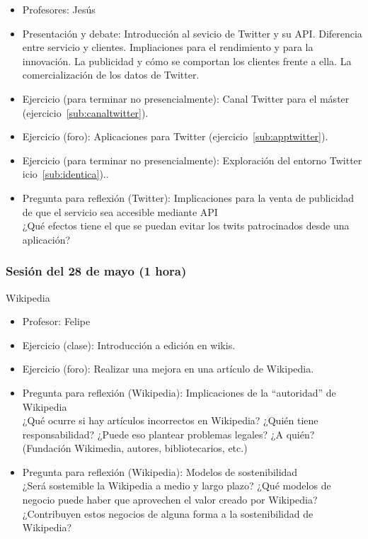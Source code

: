\documentclass[a4paper,12pt]{article}
\begin{document}
\begin{itemize}
\item Profesores: Jesús
\item Presentación y debate: Introducción al sevicio de Twitter y su API. Diferencia entre servicio y clientes. Impliaciones para el rendimiento y para la innovación. La publicidad y cómo se comportan los clientes frente a ella. La comercialización de los datos de Twitter.
\item Ejercicio (para terminar no presencialmente): Canal Twitter para el máster (ejercicio~\ref{sub:canaltwitter}).
\item Ejercicio (foro): Aplicaciones para Twitter (ejercicio~\ref{sub:apptwitter}).
\item Ejercicio (para terminar no presencialmente): Exploración del entorno Twitter
icio~\ref{sub:identica})..
\item Pregunta para reflexión (Twitter): Implicaciones para la venta de publicidad de que el servicio sea accesible mediante API \\
  ¿Qué efectos tiene el que se puedan evitar los twits patrocinados desde una aplicación?
\end{itemize}

\subsubsection{Sesión del 28 de mayo (1 hora)}


Wikipedia

\begin{itemize}
\item Profesor: Felipe
\item Ejercicio (clase): Introducción a edición en wikis.
\item Ejercicio (foro): Realizar una mejora en una artículo de Wikipedia.
\item Pregunta para reflexión (Wikipedia): Implicaciones de la ``autoridad'' de Wikipedia \\
  ¿Qué ocurre si hay artículos incorrectos en Wikipedia? ¿Quién tiene responsabilidad? ¿Puede eso plantear problemas legales? ¿A quién? (Fundación Wikimedia, autores, bibliotecarios, etc.)
\item Pregunta para reflexión (Wikipedia): Modelos de sostenibilidad \\
  ¿Será sostemible la Wikipedia a medio y largo plazo? ¿Qué modelos de negocio puede haber que aprovechen el valor creado por Wikipedia? ¿Contribuyen estos negocios de alguna forma a la sostenibilidad de Wikipedia?
\end{itemize}
\end{document}
